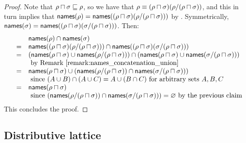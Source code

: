 \begin{proof}
Note that $\rho \sqcap \sigma \sqsubseteq \rho$,
so we have that $\rho \equiv (\rho \sqcap \sigma)(\rho/(\rho \sqcap \sigma))$,
and this in turn implies that
$\mathsf{names}(\rho) = \mathsf{names}((\rho \sqcap \sigma)(\rho/(\rho \sqcap \sigma)))$
by .
Symmetrically,
$\mathsf{names}(\sigma) = \mathsf{names}((\rho \sqcap \sigma)(\sigma/(\rho \sqcap \sigma)))$.
Then:
\[
  \begin{array}{rcll}
    &&  \names(\redseq) \cap \names(\redseqtwo) \\
  & = & \names((\redseq \sqcap \redseqtwo)(\redseq/(\redseq \sqcap \redseqtwo))) \cap \names((\redseq \sqcap \redseqtwo)(\redseqtwo/(\redseq \sqcap \redseqtwo))) \\
  & = & \left(\names(\redseq \sqcap \redseqtwo) \cup \names(\redseq/(\redseq \sqcap \redseqtwo))\right) \cap \left(\names(\redseq \sqcap \redseqtwo) \cup \names(\redseqtwo/(\redseq \sqcap \redseqtwo))\right) \\
     && \text{ by \rremark{names_concatenation_union}} \\
  & = &
        \names(\redseq \sqcap \redseqtwo) \cup 
        \left( \names(\redseq/(\redseq \sqcap \redseqtwo)) \cap \names(\redseqtwo/(\redseq \sqcap \redseqtwo)) \right) \\
  && \text{ since $(A \cup B) \cap (A \cup C) = A \cup (B \cap C)$ for arbitrary sets $A,B,C$} \\
  & = &
        \names(\redseq \sqcap \redseqtwo) \\
  && \text{ since $\left( \names(\redseq/(\redseq \sqcap \redseqtwo)) \cap \names(\redseqtwo/(\redseq \sqcap \redseqtwo)) \right) = \emptyset$ by the previous claim} \\
  \end{array}
\]
This concludes the proof.
\end{proof}

\subsection*{Distributive lattice}

